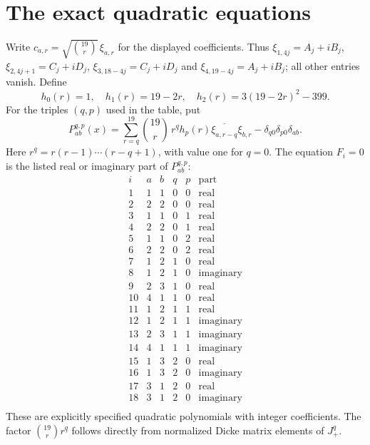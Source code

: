 \documentclass[11pt]{article}
\begin{document}
\section{The exact quadratic equations}
Write $c_{a,r}=\sqrt{\binom{19}{r}}\,\xi_{a,r}$ for the displayed coefficients.
Thus $\xi_{1,4j}=A_j+iB_j$, $\xi_{2,4j+1}=C_j+iD_j$,
$\xi_{3,18-4j}=C_j+iD_j$ and $\xi_{4,19-4j}=A_j+iB_j$;
all other entries vanish. Define
\[
h_0(r)=1,\quad h_1(r)=19-2r,\quad
h_2(r)=3(19-2r)^2-399.
\]
For the triples $(q,p)$ used in the table, put
\[
P_{ab}^{q,p}(x)=
\sum_{r=q}^{19}\binom{19}{r}\,r^{\underline q}h_p(r)
\overline{\xi_{a,r-q}}\xi_{b,r}
-\delta_{q0}\delta_{p0}\delta_{ab}.
\]
Here $r^{\underline q}=r(r-1)\cdots(r-q+1)$, with value one for $q=0$.
The equation $F_i=0$ is the listed real or imaginary part of $P_{ab}^{q,p}$:
\[
\begin{array}{c|ccccc}
i&a&b&q&p&\text{part}\\\hline
1 & 1 & 1 & 0 & 0 & \mathrm{real} \\
2 & 2 & 2 & 0 & 0 & \mathrm{real} \\
3 & 1 & 1 & 0 & 1 & \mathrm{real} \\
4 & 2 & 2 & 0 & 1 & \mathrm{real} \\
5 & 1 & 1 & 0 & 2 & \mathrm{real} \\
6 & 2 & 2 & 0 & 2 & \mathrm{real} \\
7 & 1 & 2 & 1 & 0 & \mathrm{real} \\
8 & 1 & 2 & 1 & 0 & \mathrm{imaginary} \\
9 & 2 & 3 & 1 & 0 & \mathrm{real} \\
10 & 4 & 1 & 1 & 0 & \mathrm{real} \\
11 & 1 & 2 & 1 & 1 & \mathrm{real} \\
12 & 1 & 2 & 1 & 1 & \mathrm{imaginary} \\
13 & 2 & 3 & 1 & 1 & \mathrm{imaginary} \\
14 & 4 & 1 & 1 & 1 & \mathrm{imaginary} \\
15 & 1 & 3 & 2 & 0 & \mathrm{real} \\
16 & 1 & 3 & 2 & 0 & \mathrm{imaginary} \\
17 & 3 & 1 & 2 & 0 & \mathrm{real} \\
18 & 3 & 1 & 2 & 0 & \mathrm{imaginary} \\
\end{array}
\]
These are explicitly specified quadratic polynomials with integer coefficients.
The factor $\binom{19}{r}r^{\underline q}$ follows directly from normalized Dicke
matrix elements of $J_+^q$.
\end{document}
